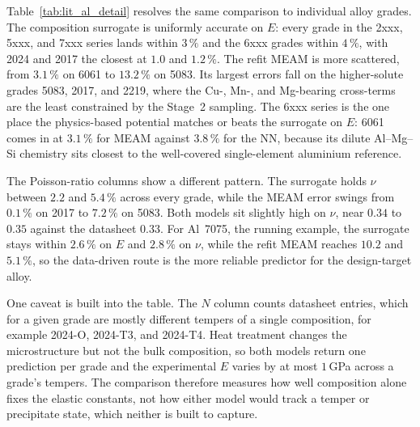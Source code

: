 \begin{table}[htbp]
	\centering
	\caption{Aluminium validation drilled down by AA series ($N=33$ of the 42
	alloys). $\langle E_\mathrm{lit}\rangle$ is the mean experimental Young's
	modulus; the last two columns are $E$ MAPE for the composition NN (ML) and
	the refit MEAM potential.}
	\label{tab:lit_al}
	
\end{table}

Table~\ref{tab:lit_al_detail} resolves the same comparison to individual alloy
grades. The composition surrogate is uniformly accurate on $E$: every grade in
the 2xxx, 5xxx, and 7xxx series lands within $3\,\%$ and the 6xxx grades within
$4\,\%$, with 2024 and 2017 the closest at $1.0$ and $1.2\,\%$. The refit MEAM
is more scattered, from $3.1\,\%$ on 6061 to $13.2\,\%$ on 5083. Its largest
errors fall on the higher-solute grades 5083, 2017, and 2219, where the Cu-,
Mn-, and Mg-bearing cross-terms are the least constrained by the Stage~2
sampling. The 6xxx series is the one place the physics-based potential matches
or beats the surrogate on $E$: 6061 comes in at $3.1\,\%$ for MEAM against
$3.8\,\%$ for the NN, because its dilute Al--Mg--Si chemistry sits closest to
the well-covered single-element aluminium reference.

The Poisson-ratio columns show a different pattern. The surrogate holds
$\nu$ between $2.2$ and $5.4\,\%$ across every grade, while the MEAM error
swings from $0.1\,\%$ on 2017 to $7.2\,\%$ on 5083. Both models sit slightly
high on $\nu$, near $0.34$ to $0.35$ against the datasheet $0.33$. For
Al~7075, the running example, the surrogate stays within $2.6\,\%$ on $E$ and
$2.8\,\%$ on $\nu$, while the refit MEAM reaches $10.2$ and $5.1\,\%$, so the
data-driven route is the more reliable predictor for the design-target alloy.

One caveat is built into the table. The $N$ column counts datasheet entries,
which for a given grade are mostly different tempers of a single composition,
for example 2024-O, 2024-T3, and 2024-T4. Heat treatment changes the
microstructure but not the bulk composition, so both models return one
prediction per grade and the experimental $E$ varies by at most $1$\,GPa across
a grade's tempers. The comparison therefore measures how well composition alone
fixes the elastic constants, not how either model would track a temper or
precipitate state, which neither is built to capture.

\begin{table}[htbp]
	\centering
	\caption{Aluminium validation resolved to individual alloy grades. $N$ is
	the number of datasheet entries (tempers) per grade and
	$\langle E_\mathrm{lit}\rangle$ their mean experimental Young's modulus in
	GPa; the remaining columns are $E$ and $\nu$ MAPE in percent for the
	composition NN (ML) and the refit MEAM potential. Unphysical MEAM runs are
	excluded.}
	\label{tab:lit_al_detail}
	
\end{table}
